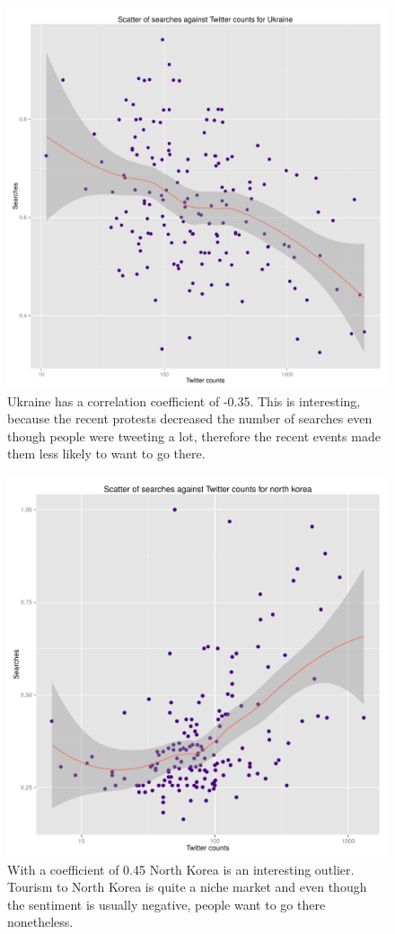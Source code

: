 \documentclass[minf,twoside,singlespacing,parskip,frontabs,notimes,11pt]{infthesis}
\begin{document}
\begin{figure}[]
\includegraphics[scale=0.6]{Ukraine}
\caption{Ukraine has a correlation coefficient of -0.35. This is interesting, because the recent protests decreased the number of searches even though people were tweeting a lot, therefore the recent events made them less likely to want to go there. }
\end{figure}

\begin{figure}[]
\includegraphics[scale=0.65]{north-korea}
\caption{With a coefficient of 0.45 North Korea is an interesting outlier. Tourism to North Korea is quite a niche market and even though the sentiment is usually negative, people want to go there nonetheless.  }
\end{figure}
\end{document}
